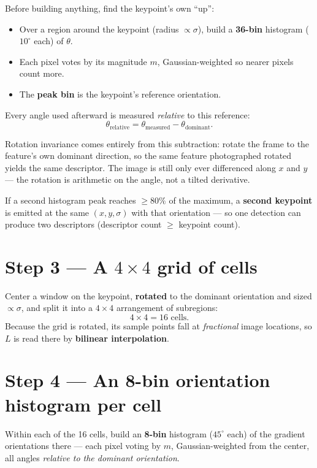 \documentclass[11pt]{article}
\begin{document}
Before building anything, find the keypoint's own ``up'':
\begin{itemize}[nosep]
  \item Over a region around the keypoint (radius $\propto \sigma$), build a
        \textbf{36-bin} histogram ($10^\circ$ each) of $\theta$.
  \item Each pixel votes by its magnitude $m$, Gaussian-weighted so nearer pixels count more.
  \item The \textbf{peak bin} is the keypoint's reference orientation.
\end{itemize}
Every angle used afterward is measured \emph{relative} to this reference:
\[
\theta_{\text{relative}} = \theta_{\text{measured}} - \theta_{\text{dominant}}.
\]
\begin{keybox}
Rotation invariance comes entirely from this subtraction: rotate the frame to the feature's
own dominant direction, so the same feature photographed rotated yields the same descriptor.
The image is still only ever differenced along $x$ and $y$ --- the rotation is arithmetic on
the angle, not a tilted derivative.
\end{keybox}
If a second histogram peak reaches $\ge 80\%$ of the maximum, a \textbf{second keypoint} is
emitted at the same $(x, y, \sigma)$ with that orientation --- so one detection can produce
two descriptors (descriptor count $\ge$ keypoint count).

\section{Step 3 --- A $4\times 4$ grid of cells}

Center a window on the keypoint, \textbf{rotated} to the dominant orientation and sized
$\propto \sigma$, and split it into a $4\times 4$ arrangement of subregions:
\[
4 \times 4 = 16 \text{ cells}.
\]
Because the grid is rotated, its sample points fall at \emph{fractional} image locations, so
$L$ is read there by \textbf{bilinear interpolation}.

\section{Step 4 --- An 8-bin orientation histogram per cell}

Within each of the 16 cells, build an \textbf{8-bin} histogram ($45^\circ$ each) of the
gradient orientations there --- each pixel voting by $m$, Gaussian-weighted from the center,
all angles \emph{relative to the dominant orientation}.
\end{document}
